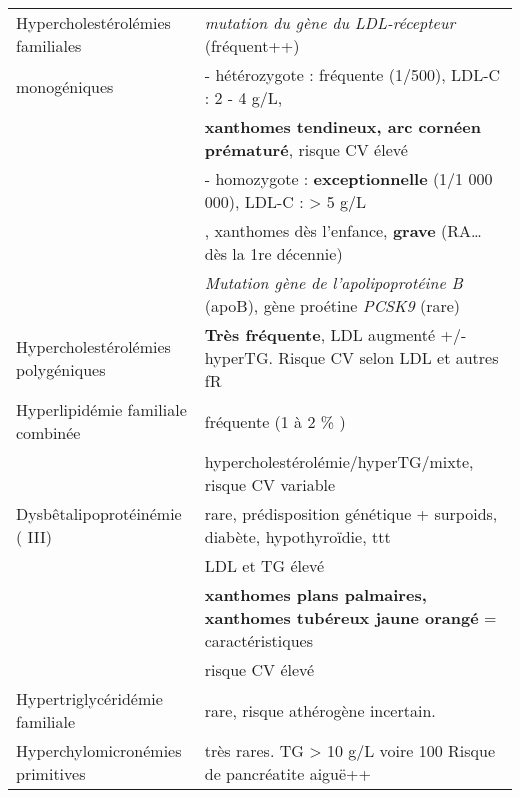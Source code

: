 \documentclass[11pt]{article}
\begin{document}
\begin{center}
\begin{tabular}{ll}
Hypercholestérolémies familiales & \emph{mutation du gène du LDL-récepteur} (fréquent++)\\
monogéniques & -  hétérozygote : fréquente (1/500), LDL-C : 2 - 4 g/L,\\
 & \textbf{xanthomes tendineux, arc cornéen prématuré}, risque CV élevé\\
 & -  homozygote : \textbf{exceptionnelle} (1/1 000 000),  LDL-C : >  5 g/L\\
 & , xanthomes dès l'enfance, \textbf{grave} (RA\ldots{} dès la 1re décennie)\\
 & \emph{Mutation gène de l'apolipoprotéine B} (apoB), gène proétine \emph{PCSK9} (rare)\\
\hline
Hypercholestérolémies polygéniques & \textbf{Très fréquente}, LDL augmenté +/- hyperTG. Risque CV selon LDL et autres fR\\
\hline
Hyperlipidémie familiale combinée & fréquente (1 à 2 \% )\\
 & hypercholestérolémie/hyperTG/mixte, risque CV variable\\
\hline
Dysbêtalipoprotéinémie ( III) & rare,  prédisposition génétique  +  surpoids, diabète, hypothyroïdie, ttt\\
 & LDL et TG élevé\\
 & \textbf{xanthomes plans palmaires,  xanthomes tubéreux jaune orangé} = caractéristiques\\
 & risque CV élevé\\
\hline
Hypertriglycéridémie familiale & rare, risque athérogène incertain.\\
Hyperchylomicronémies primitives & très rares. TG >  10 g/L voire 100 Risque de pancréatite aiguë++\\
\end{tabular}
\end{center}
\end{document}
